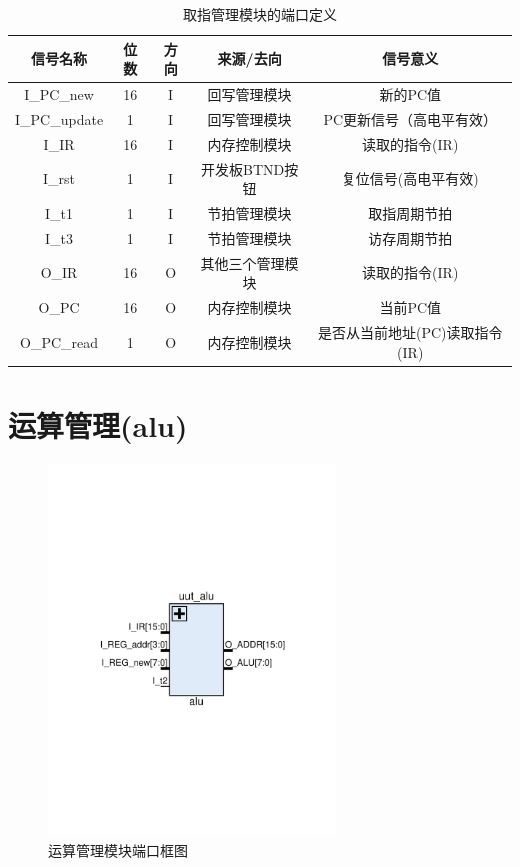 \documentclass[forprint]{WHUBachelor}
\begin{document}
\begin{table}[ht]
  \centering
  \begin{tabular}{c c c c c}
    \hline
    信号名称 & 位数 & 方向 & 来源/去向 & 信号意义 \\
    \hline
    I\_PC\_new & 16 & I & 回写管理模块 & 新的PC值 \\
    I\_PC\_update & 1 & I & 回写管理模块 & PC更新信号（高电平有效） \\
    I\_IR & 16 & I & 内存控制模块 & 读取的指令(IR) \\
    I\_rst & 1 & I & 开发板BTND按钮 & 复位信号(高电平有效) \\
    I\_t1 & 1 & I & 节拍管理模块 & 取指周期节拍 \\
    I\_t3 & 1 & I & 节拍管理模块 & 访存周期节拍 \\
    O\_IR & 16 & O & 其他三个管理模块 & 读取的指令(IR) \\
    O\_PC & 16 & O & 内存控制模块 & 当前PC值\\
    O\_PC\_read & 1 & O & 内存控制模块 & 是否从当前地址(PC)读取指令(IR)\\
    \hline
  \end{tabular}
  \caption{取指管理模块的端口定义}
  \label{tab:ports:fetch}
\end{table}

\section{运算管理(alu)}

\begin{figure}[H]
  \centering
  \includegraphics[width=3in]{figures/ports/alu.pdf}
  \caption{运算管理模块端口框图}
  \label{fig:ports:alu}
\end{figure}
\end{document}
